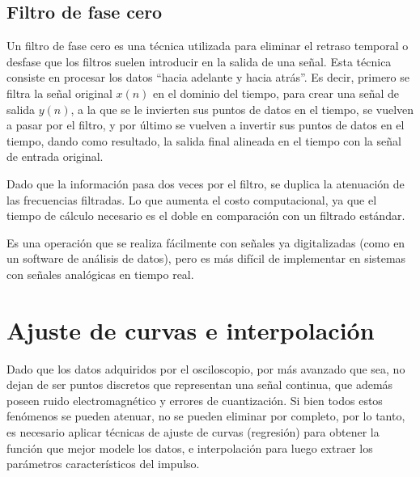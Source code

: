 \subsection{Filtro de fase cero}
Un filtro de fase cero es una técnica utilizada para eliminar el retraso temporal o desfase que los filtros suelen introducir en la salida de una señal.
Esta técnica consiste en procesar los datos \enquote{hacia adelante y hacia atrás}. Es decir, primero se filtra la señal original $x(n)$ en el dominio del tiempo, para crear una señal de salida $y(n)$, a la que se le invierten sus puntos de datos en el tiempo, se vuelven a pasar por el filtro, y por último se vuelven a invertir sus puntos de datos en el tiempo, dando como resultado, la salida final alineada en el tiempo con la señal de entrada original.\par
Dado que la información pasa dos veces por el filtro, se duplica la atenuación de las frecuencias filtradas. Lo que aumenta el costo computacional, ya que el tiempo de cálculo necesario es el doble en comparación con un filtrado estándar.\par
Es una operación que se realiza fácilmente con señales ya digitalizadas (como en un software de análisis de datos), pero es más difícil de implementar en sistemas con señales analógicas en tiempo real.

\section{Ajuste de curvas e interpolación}
Dado que los datos adquiridos por el osciloscopio, por más avanzado que sea, no dejan de ser puntos discretos que representan una señal continua, que además poseen ruido electromagnético y errores de cuantización. Si bien todos estos fenómenos se pueden atenuar, no se pueden eliminar por completo, por lo tanto, es necesario aplicar técnicas de ajuste de curvas (regresión) para obtener la función que mejor modele los datos, e interpolación para luego extraer los parámetros característicos del impulso.\par

